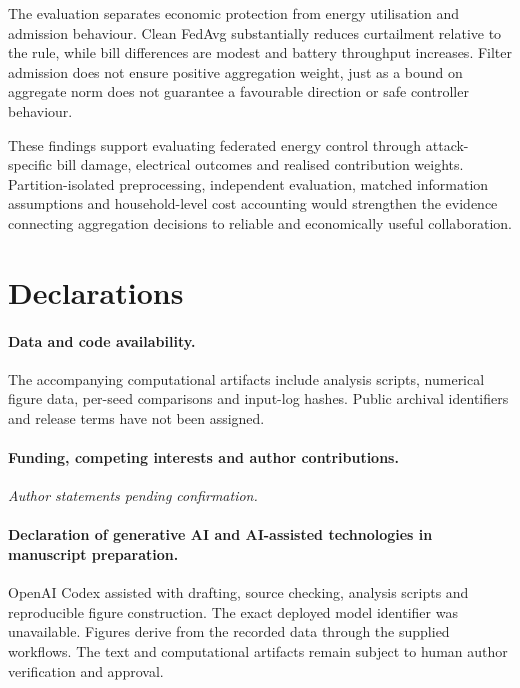 \documentclass[preprint,12pt,a4paper]{elsarticle}
\begin{document}
The evaluation separates economic protection from energy utilisation and admission behaviour. Clean FedAvg substantially reduces curtailment relative to the rule, while bill differences are modest and battery throughput increases. Filter admission does not ensure positive aggregation weight, just as a bound on aggregate norm does not guarantee a favourable direction or safe controller behaviour.

These findings support evaluating federated energy control through attack-specific bill damage, electrical outcomes and realised contribution weights. Partition-isolated preprocessing, independent evaluation, matched information assumptions and household-level cost accounting would strengthen the evidence connecting aggregation decisions to reliable and economically useful collaboration.



\section*{Declarations}
\paragraph{Data and code availability.}
The accompanying computational artifacts include analysis scripts, numerical figure data, per-seed comparisons and input-log hashes. Public archival identifiers and release terms have not been assigned.
\paragraph{Funding, competing interests and author contributions.}
\textit{Author statements pending confirmation.}
\paragraph{Declaration of generative AI and AI-assisted technologies in manuscript preparation.}
OpenAI Codex assisted with drafting, source checking, analysis scripts and reproducible figure construction. The exact deployed model identifier was unavailable. Figures derive from the recorded data through the supplied workflows. The text and computational artifacts remain subject to human author verification and approval.


\clearpage
\end{document}
